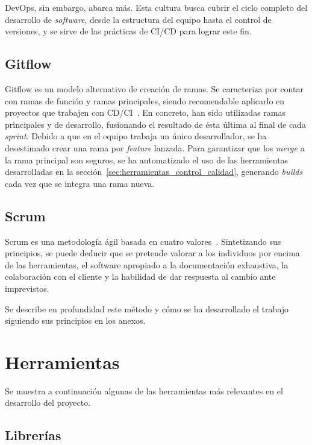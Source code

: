 DevOps, sin embargo, abarca más. Esta cultura busca cubrir el ciclo completo del desarrollo de \textit{software}, desde la estructura del equipo hasta el control de versiones, y se sirve de las prácticas de CI/CD para lograr este fin.

\subsection{Gitflow}

Gitflow es un modelo alternativo de creación de ramas. Se caracteriza por contar con ramas de función y ramas principales, siendo recomendable aplicarlo en proyectos que trabajen con CD/CI~\cite{gitFlow}. En concreto, han sido utilizadas ramas principales y de desarrollo, fusionando el resultado de ésta última al final de cada \textit{sprint}. Debido a que en el equipo trabaja un único desarrollador, se ha desestimado crear una rama por \textit{feature} lanzada. Para garantizar que los \textit{merge} a la rama principal son seguros, se ha automatizado el uso de las herramientas desarrolladas en la sección~\ref{sec:herramientas_control_calidad}, generando \textit{builds} cada vez que se integra una rama nueva.

\subsection{Scrum}

Scrum es una metodología ágil basada en cuatro valores~\cite{scrumMaster2022}. Sintetizando sus principios, se puede deducir que se pretende valorar a los individuos por encima de las herramientas, el software apropiado a la documentación exhaustiva, la colaboración con el cliente y la habilidad de dar respuesta al cambio ante imprevistos.

Se describe en profundidad este método y cómo se ha desarrollado el trabajo siguiendo sus principios en los anexos.

\section{Herramientas}

Se muestra a continuación algunas de las herramientas más relevantes en el desarrollo del proyecto.

\subsection{Librerías}

